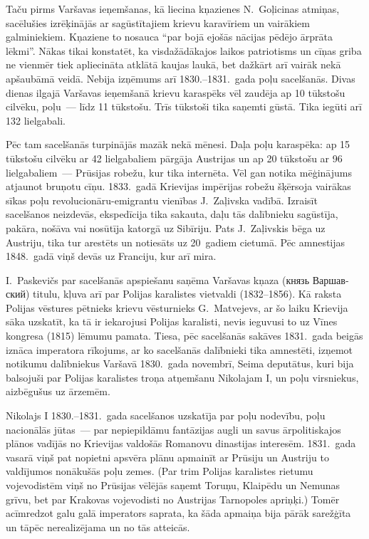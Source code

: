 \documentclass[twoside,a5paper,12pt,fleqn,openany]{extbook}
\newcommand{\rutxti}[1]{\textrussian{#1}}
\begin{document}
\vspace{1.5em}



Taču pirms Varšavas ieņemšanas, kā liecina kņazienes N.~Goļicinas atmiņas, sacēlušies izrēķinājās ar sagūstītajiem krievu karavīriem un vairākiem galminiekiem. Kņaziene to nosauca ``par bojā ejošās nācijas pēdējo ārprāta lēkmi''. Nākas tikai konstatēt, ka visdažādākajos laikos patriotisms un cīņas griba ne vienmēr tiek apliecināta atklātā kaujas laukā, bet dažkārt arī vairāk nekā apšaubāmā veidā. Nebija izņēmums arī 1830.--1831.~gada poļu sacelšanās. Divas dienas ilgajā Varšavas ieņemšanā krievu karaspēks vēl zaudēja ap 10 tūkstošu cilvēku, poļu~--- līdz 11 tūkstošu. Trīs tūkstoši tika saņemti gūstā. Tika iegūti arī 132 lielgabali.

Pēc tam sacelšanās turpinājās mazāk nekā mēnesi. Daļa poļu karaspēka: ap 15 tūkstošu cilvēku ar 42 lielgabaliem pārgāja Austrijas un ap 20 tūkstošu ar 96 lielgabaliem~--- Prūsijas robežu, kur tika internēta. Vēl gan notika mēģinājums atjaunot bruņotu cīņu. 1833.~gadā Krievijas impērijas robežu šķērsoja vairākas sīkas poļu revolucionāru-emigrantu vienības J.~Zaļivska vadībā. Izraisīt sacelšanos neizdevās, ekspedīcija tika sakauta, daļu tās dalībnieku sagūstīja, pakāra, nošāva vai nosūtīja katorgā uz Sibīriju. Pats J.~Zaļivskis bēga uz Austriju, tika tur arestēts un notiesāts uz 20~gadiem cietumā. Pēc amnestijas 1848.~gadā viņš devās uz Franciju, kur arī mira.

I.~Paskevičs par sacelšanās apspiešanu saņēma Varšavas kņaza (\rutxti{князь Варшавский}) titulu, kļuva arī par Polijas karalistes vietvaldi (1832--1856). Kā raksta Polijas vēstures pētnieks krievu vēsturnieks G.~Matvejevs, ar šo laiku Krievija sāka uzskatīt, ka tā ir iekarojusi Polijas karalisti, nevis ieguvusi to uz Vīnes kongresa (1815) lēmumu pamata. Tiesa, pēc sacelšanās sakāves 1831.~gada beigās iznāca imperatora rīkojums, ar ko sacelšanās dalībnieki tika amnestēti, izņemot notikumu dalībniekus Varšavā 1830.~gada novembrī, Seima deputātus, kuri bija balsojuši par Polijas karalistes troņa atņemšanu Nikolajam I, un poļu virsniekus, aizbēgušus uz ārzemēm.

Nikolajs I 1830.--1831.~gada sacelšanos uzskatīja par poļu nodevību, poļu nacionālās jūtas~--- par nepiepildāmu fantāzijas augli un savus ārpolitiskajos plānos vadījās no Krievijas valdošās Romanovu dinastijas interesēm. 1831.~gada vasarā viņš pat nopietni apsvēra plānu apmainīt ar Prūsiju un Austriju to valdījumos nonākušās poļu zemes. (Par trim Polijas karalistes rietumu vojevodistēm viņš no Prūsijas vēlējās saņemt Toruņu, Klaipēdu un Nemunas grīvu, bet par Krakovas vojevodisti no Austrijas Tarnopoles apriņķi.) Tomēr acīmredzot galu galā imperators saprata, ka šāda apmaiņa bija pārāk sarežģīta un tāpēc nerealizējama un no tās atteicās.
\end{document}
